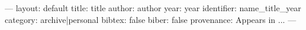 ---
layout: default
title: {title}
author: {author}
year: {year}
identifier: name_title_{year}
category: archive|personal
bibtex: false
biber: false
provenance: Appears in ...
---

